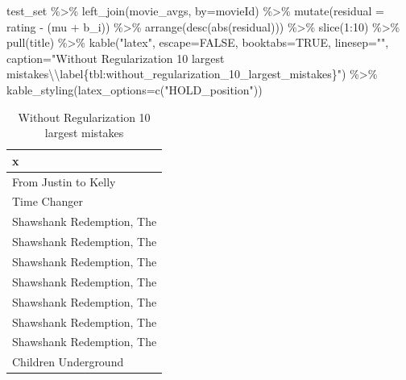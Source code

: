 \documentclass[
]{article}
\newenvironment{Shaded}{}{}
\newcommand{\AttributeTok}[1]{\textcolor[rgb]{0.49,0.56,0.16}{#1}}
\newcommand{\ConstantTok}[1]{\textcolor[rgb]{0.53,0.00,0.00}{#1}}
\newcommand{\DecValTok}[1]{\textcolor[rgb]{0.25,0.63,0.44}{#1}}
\newcommand{\FunctionTok}[1]{\textcolor[rgb]{0.02,0.16,0.49}{#1}}
\newcommand{\NormalTok}[1]{#1}
\newcommand{\SpecialCharTok}[1]{\textcolor[rgb]{0.25,0.44,0.63}{#1}}
\newcommand{\StringTok}[1]{\textcolor[rgb]{0.25,0.44,0.63}{#1}}
\begin{document}
\begin{Shaded}
\begin{Highlighting}[]
\NormalTok{test\_set }\SpecialCharTok{\%\textgreater{}\%} 
  \FunctionTok{left\_join}\NormalTok{(movie\_avgs, }\AttributeTok{by=}\StringTok{\textquotesingle{}movieId\textquotesingle{}}\NormalTok{) }\SpecialCharTok{\%\textgreater{}\%}
  \FunctionTok{mutate}\NormalTok{(}\AttributeTok{residual =}\NormalTok{ rating }\SpecialCharTok{{-}}\NormalTok{ (mu }\SpecialCharTok{+}\NormalTok{ b\_i)) }\SpecialCharTok{\%\textgreater{}\%}
  \FunctionTok{arrange}\NormalTok{(}\FunctionTok{desc}\NormalTok{(}\FunctionTok{abs}\NormalTok{(residual))) }\SpecialCharTok{\%\textgreater{}\%}  
  \FunctionTok{slice}\NormalTok{(}\DecValTok{1}\SpecialCharTok{:}\DecValTok{10}\NormalTok{) }\SpecialCharTok{\%\textgreater{}\%} 
  \FunctionTok{pull}\NormalTok{(title) }\SpecialCharTok{\%\textgreater{}\%} 
    \FunctionTok{kable}\NormalTok{(}\StringTok{"latex"}\NormalTok{, }\AttributeTok{escape=}\ConstantTok{FALSE}\NormalTok{, }\AttributeTok{booktabs=}\ConstantTok{TRUE}\NormalTok{, }\AttributeTok{linesep=}\StringTok{""}\NormalTok{, }
          \AttributeTok{caption=}\StringTok{"Without Regularization 10 largest mistakes}\SpecialCharTok{\textbackslash{}\textbackslash{}}\StringTok{label\{tbl:without\_regularization\_10\_largest\_mistakes\}"}\NormalTok{) }\SpecialCharTok{\%\textgreater{}\%} 
      \FunctionTok{kable\_styling}\NormalTok{(}\AttributeTok{latex\_options=}\FunctionTok{c}\NormalTok{(}\StringTok{"HOLD\_position"}\NormalTok{))}
\end{Highlighting}
\end{Shaded}

\begin{table}[H]

\caption{\label{tab:reg_1}Without Regularization 10 largest mistakes\label{tbl:without_regularization_10_largest_mistakes}}
\centering
\begin{tabular}[t]{l}
\toprule
x\\
\midrule
From Justin to Kelly\\
Time Changer\\
Shawshank Redemption, The\\
Shawshank Redemption, The\\
Shawshank Redemption, The\\
Shawshank Redemption, The\\
Shawshank Redemption, The\\
Shawshank Redemption, The\\
Shawshank Redemption, The\\
Children Underground\\
\bottomrule
\end{tabular}
\end{table}
\end{document}
